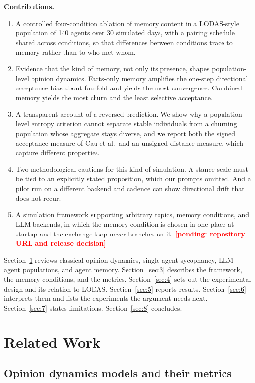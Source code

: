 \documentclass[11pt,a4paper]{article}
\newcommand{\pending}[1]{\textcolor{red}{\textbf{[#1]}}}
\begin{document}
\textbf{Contributions.}

\begin{enumerate}
  \item A controlled four-condition ablation of memory content in a LODAS-style population of 140 agents over 30 simulated days, with a pairing schedule shared across conditions, so that differences between conditions trace to memory rather than to who met whom.
  \item Evidence that the kind of memory, not only its presence, shapes population-level opinion dynamics. Facts-only memory amplifies the one-step directional acceptance bias about fourfold and yields the most convergence. Combined memory yields the most churn and the least selective acceptance.
  \item A transparent account of a reversed prediction. We show why a population-level entropy criterion cannot separate stable individuals from a churning population whose aggregate stays diverse, and we report both the signed acceptance measure of Cau et al.\ and an unsigned distance measure, which capture different properties.
  \item Two methodological cautions for this kind of simulation. A stance scale must be tied to an explicitly stated proposition, which our prompts omitted. And a pilot run on a different backend and cadence can show directional drift that does not recur.
  \item A simulation framework supporting arbitrary topics, memory conditions, and LLM backends, in which the memory condition is chosen in one place at startup and the exchange loop never branches on it. \pending{pending: repository URL and release decision}
\end{enumerate}

Section~\ref{sec:2} reviews classical opinion dynamics, single-agent sycophancy, LLM agent populations, and agent memory. Section~\ref{sec:3} describes the framework, the memory conditions, and the metrics. Section~\ref{sec:4} sets out the experimental design and its relation to LODAS. Section~\ref{sec:5} reports results. Section~\ref{sec:6} interprets them and lists the experiments the argument needs next. Section~\ref{sec:7} states limitations. Section~\ref{sec:8} concludes.

\section{Related Work}\label{sec:2}

\subsection{Opinion dynamics models and their metrics}\label{sec:2.1}
\end{document}
